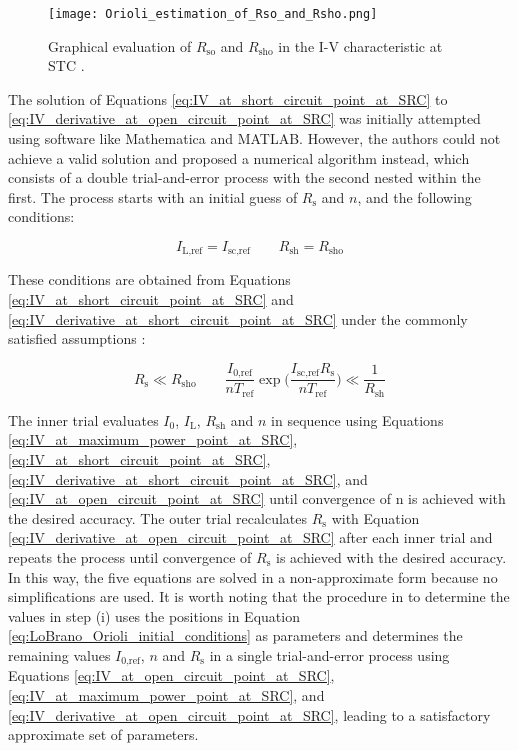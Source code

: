 \begin{figure}[H]
    \centering
    \texttt{[image: Orioli\_estimation\_of\_Rso\_and\_Rsho.png]}
    \caption{\small Graphical evaluation of \(R_{\text{so}}\) and \(R_{\text{sho}}\) in the I-V characteristic at STC \cite{Orioli}.}
    \label{fig:Orioli_estimation_of_Rso_and_Rsho}
\end{figure}

The solution of Equations \ref{eq:IV_at_short_circuit_point_at_SRC} to
\ref{eq:IV_derivative_at_open_circuit_point_at_SRC} was initially
attempted using software like Mathematica and MATLAB. However, the
authors could not achieve a valid solution and proposed a numerical
algorithm instead, which consists of a double trial-and-error
process with the second nested within the first. The process starts
with an initial guess of \(R_{\text{s}}\) and \(n\), and the following conditions:

\begin{equation}
    I_{\text{L,ref}} = I_{\text{sc,ref}} \qquad R_{\text{sh}} = R_{\text{sho}}
    \label{eq:LoBrano_Orioli_initial_conditions}
\end{equation}

\noindent
These conditions are obtained from Equations \ref{eq:IV_at_short_circuit_point_at_SRC}
and \ref{eq:IV_derivative_at_short_circuit_point_at_SRC} under the commonly satisfied
assumptions \cite[p. 1362]{LoBrano}:

\begin{equation}
    R_{\text{s}} \ll R_{\text{sho}} \qquad \frac{I_{\text{0,ref}}}{nT_{\text{ref}}}\exp\bigl(\frac{I_{\text{sc,ref}}R_{\text{s}}}{nT_{\text{ref}}}\bigr) \ll \frac{1}{R_{\text{sh}}}
\end{equation}

\noindent
The inner trial evaluates \(I_{0}\), \(I_{\text{L}}\), \(R_{\text{sh}}\) and \(n\) in
sequence using Equations \ref{eq:IV_at_maximum_power_point_at_SRC},
\ref{eq:IV_at_short_circuit_point_at_SRC}, \ref{eq:IV_derivative_at_short_circuit_point_at_SRC},
and \ref{eq:IV_at_open_circuit_point_at_SRC} until convergence of n is
achieved with the desired accuracy. The outer trial recalculates \(R_{\text{s}}\)
with Equation \ref{eq:IV_derivative_at_open_circuit_point_at_SRC} after
each inner trial and repeats the process until convergence of \(R_{\text{s}}\) is
achieved with the desired accuracy. In this way, the five equations are
solved in a non-approximate form because no simplifications are used.
It is worth noting that the procedure in \cite[p. 1163f]{Orioli} to determine
the values in step (i) uses the positions in Equation \ref{eq:LoBrano_Orioli_initial_conditions}
as parameters and determines the remaining values \(I_{\text{0,ref}}\), \(n\) and \(R_{\text{s}}\)
in a single trial-and-error process using Equations
\ref{eq:IV_at_open_circuit_point_at_SRC}, \ref{eq:IV_at_maximum_power_point_at_SRC},
and \ref{eq:IV_derivative_at_open_circuit_point_at_SRC}, leading to a satisfactory
approximate set of parameters.

